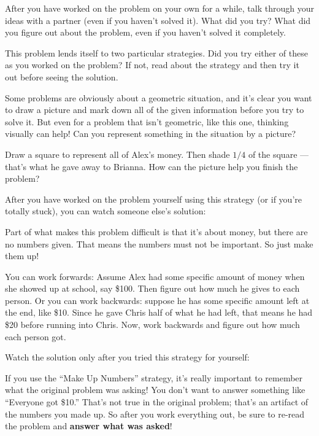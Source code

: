 \begin{thinkpair*}
After you have worked on the problem on your own for a while, talk through your ideas with a partner (even if you haven't solved it).  What did you try?   What did you figure out about the problem, even if you haven't solved it completely.
\end{thinkpair*}


This problem lends itself to two particular strategies.  Did you try either of these as you worked on the problem?  If not, read about the strategy and then try it out before seeing the solution.

\begin{ps}
Some problems are obviously about a geometric situation, and it's clear you want to draw a picture and mark down all of the given information before you try to solve it.  But even for a problem that isn't geometric, like this one, thinking visually can help!  Can you represent something in the situation by a picture?  
\end{ps}

Draw a square to represent all of Alex's money.  Then shade $1/4$ of the square --- that's what he gave away to Brianna.  How can the picture help you finish the problem?

After you have worked on the problem yourself using this strategy (or if you're totally stuck), you can watch someone else's solution:


\begin{ps}
Part of what makes this problem difficult is that it's about money, but there are no numbers given.  That means the numbers must not be important.  So just make them up!  
\end{ps}

You can  work forwards: Assume Alex had some specific amount of money when she showed up at school, say \$100.  Then figure out how much he gives to each person.  Or you can work backwards: suppose he has some specific amount left at the end, like \$10.  Since he gave Chris half of what he had left, that means he had \$20 before running into Chris.   Now, work backwards and figure out how much each person got.

Watch the solution only after you tried this strategy for yourself:

If you use the ``Make Up Numbers'' strategy, it's really important to remember what the original problem was asking!  You don't want to answer something like ``Everyone got \$10.''  That's not true in the original problem; that's an artifact of the numbers you made up.  So after you work everything out, be sure to re-read the problem and {\bf answer what was asked}!



